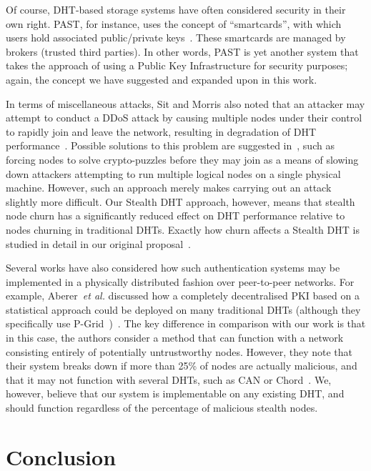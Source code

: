 \documentclass{elsart3p}
\begin{document}
Of course, DHT-based storage systems have often considered security
in their own right. PAST, for instance, uses the concept of
``smartcards'', with which users hold associated public/private
keys~\cite{Druschel01PAST}. These smartcards are managed by brokers
(trusted third parties). In other words, PAST is yet another system
that takes the approach of using a Public Key Infrastructure for
security purposes; again, the concept we have suggested and expanded
upon in this work.

In terms of miscellaneous attacks, Sit and Morris also noted that an
attacker may attempt to conduct a DDoS attack by causing multiple
nodes under their control to rapidly join and leave the network,
resulting in degradation of DHT
performance~\cite{Rhea04Handling,Li04Comparing}. Possible solutions
to this problem are suggested in~\cite{Castro02Secure}, such as
forcing nodes to solve crypto-puzzles before they may join as a
means of slowing down attackers attempting to run multiple logical
nodes on a single physical machine. However, such an approach merely
makes carrying out an attack slightly more difficult. Our Stealth
DHT approach, however, means that stealth node churn has a
significantly reduced effect on DHT performance relative to nodes
churning in traditional DHTs. Exactly how churn affects a Stealth
DHT is studied in detail in our original
proposal~\cite{Brampton06Stealth}.

Several works have also considered how such authentication systems
may be implemented in a physically distributed fashion over
peer-to-peer networks. For example, Aberer~\emph{et al.} discussed
how a completely decentralised PKI based on a statistical approach
could be deployed on many traditional DHTs (although they
specifically use
P-Grid~\cite{Plaxton97Accessing})~\cite{Aberer04Decentralized}. The
key difference in comparison with our work is that in this case, the
authors consider a method that can function with a network
consisting entirely of potentially untrustworthy nodes. However,
they note that their system breaks down if more than 25\% of nodes
are actually malicious, and that it may not function with several
DHTs, such as CAN or Chord~\cite{Ratnasamy01Scalable,Stoica01Chord}.
We, however, believe that our system is implementable on any
existing DHT, and should function regardless of the percentage of
malicious stealth nodes.

\section{Conclusion}
\label{sect-conclusion}
\end{document}
